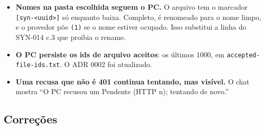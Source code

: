 \documentclass[11pt,a4paper]{article}
\begin{document}
\begin{itemize}
  \item \textbf{Nomes na pasta escolhida seguem o PC.} O arquivo tem o
        marcador \texttt{[syn-<uuid>]} só enquanto baixa. Completo, é
        renomeado para o nome limpo, e o provedor põe \texttt{(1)} se o nome
        estiver ocupado. Isso substitui a linha do SYN-014 c.3 que proibia o
        rename.
  \item \textbf{O PC persiste os ids de arquivo aceitos}: os últimos 1000, em
        \texttt{accepted-file-ids.txt}. O ADR 0002 foi atualizado.
  \item \textbf{Uma recusa que não é 401 continua tentando, mas visível.} O
        chat mostra ``O PC recusou um Pendente (HTTP n); tentando de novo.''
\end{itemize}

\subsection*{Correções}
\end{document}
